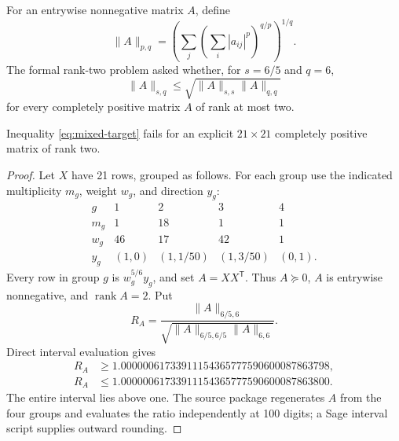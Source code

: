For an entrywise nonnegative matrix $A$, define
\[
\|A\|_{p,q}=\left(\sum_j\left(\sum_i |a_{ij}|^p\right)^{q/p}\right)^{1/q}.
\]
The formal rank-two problem asked whether, for $s=6/5$ and $q=6$,
\begin{equation}\label{eq:mixed-target}
\|A\|_{s,q}\le\sqrt{\|A\|_{s,s}\|A\|_{q,q}}
\end{equation}
for every completely positive matrix $A$ of rank at most two.

\begin{theorem}\label{thm:mixed}
Inequality \eqref{eq:mixed-target} fails for an explicit $21\times21$ completely positive matrix of rank two.
\end{theorem}
\begin{proof}
Let $X$ have 21 rows, grouped as follows.  For each group use the indicated multiplicity $m_g$, weight $w_g$, and direction $y_g$:
\[
\begin{array}{c|cccc}
g&1&2&3&4\\ \hline
m_g&1&18&1&1\\
w_g&46&17&42&1\\
y_g&(1,0)&(1,1/50)&(1,3/50)&(0,1).
\end{array}
\]
Every row in group $g$ is $w_g^{5/6}y_g$, and set $A=XX^{\mathsf T}$.  Thus $A\succeq0$, $A$ is entrywise nonnegative, and $\operatorname{rank}A=2$.  Put
\[
R_A=\frac{\|A\|_{6/5,6}}
{\sqrt{\|A\|_{6/5,6/5}\|A\|_{6,6}}}.
\]
Direct interval evaluation gives
\begin{align*}
R_A&\ge 1.00000061733911154365777590600087863798,\\
R_A&\le 1.00000061733911154365777590600087863800.
\end{align*}
The entire interval lies above one.  The source package regenerates $A$ from the four groups and evaluates the ratio independently at 100 digits; a Sage interval script supplies outward rounding.
\end{proof}
